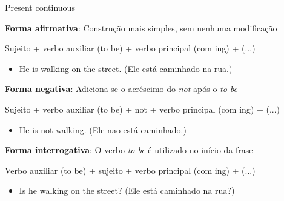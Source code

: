 \documentclass[compress,mathserif,xcolor=table]{beamer}
\begin{document}

\begin{frame}{Present continuous}

\textbf{Forma afirmativa}: Construção mais simples, sem nenhuma modificação

Sujeito + verbo auxiliar (to be) + verbo principal (com ing) + (...)
\begin{itemize}
    \item He is walking on the street. (Ele está caminhado na rua.)
\end{itemize}

\vspace{0.25cm}

\textbf{Forma negativa}: Adiciona-se o acréscimo do \textit{not} após o \textit{to be}

Sujeito + verbo auxiliar (to be) + not + verbo principal (com ing) + (...)
\begin{itemize}
    \item He is not walking. (Ele nao está caminhado.)
\end{itemize}

\vspace{0.25cm}

\textbf{Forma interrogativa}: O verbo \textit{to be} é utilizado no início da frase

Verbo auxiliar (to be) + sujeito + verbo principal (com ing) + (...)
\begin{itemize}
    \item Is he walking on the street? (Ele está caminhado na rua?)
\end{itemize}

\end{frame}


\end{document}
